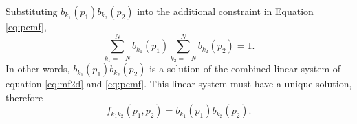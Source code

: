 Substituting $b_{k_1}(p_1)b_{k_2}(p_2)$ into 
the additional constraint in Equation \ref{eq:pcmf},
\begin{equation}
\sum_{k_1=-N}^Nb_{k_1}(p_1)\sum_{k_2=-N}^Nb_{k_2}(p_2)=1.
\end{equation}
In other words, 
$b_{k_1}(p_1)b_{k_2}(p_2)$ is a solution of 
the combined linear system of equation \ref{eq:mf2d} and \ref{eq:pcmf}.
This linear system must have a unique solution, therefore
\begin{equation}
f_{k_1k_2}(p_1,p_2)=b_{k_1}(p_1)b_{k_2}(p_2).
\end{equation}




